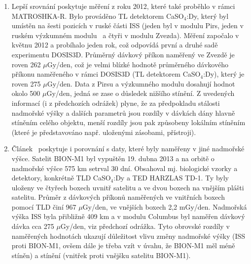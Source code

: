 \begin{enumerate}
není \cite{passDetectors}. (Poznámka: lze srovnat obr. \ref{fig:dosis_passDetectors_LETspektrum} s obr. \ref{fig:stineni} -- rozdíl ve spektrech je způsoben tím, že první obr. představuje diferenciální spektrum, zatímco druhý zobrazuje integrální spektrum.) 
\begin{figure}[h]
  \centering
  \texttt{[image: dosis\_LETspektrum\_passDetectors.jpg]}
  \caption{$\LET$ spektra z dat naměřených v modulu Pirs (Piers-1) a v modulu Zvezda (SM) v příslušných SPD.~\cite{passDetectors}}
  \label{fig:dosis_passDetectors_LETspektrum}
\end{figure}
\item Lepší srovnání poskytuje měření z roku 2012, které také proběhlo v rámci MATROSHKA-R. Bylo prováděno TL detektorem CaSO$_4$:Dy, který byl umístěn na šesti pozicích v ruské části ISS (jeden byl v modulu Pirs, jeden v ruském výzkumném modulu~\cite{researchModule} a čtyři v modulu Zvezda). Měření započalo v květnu 2012 a probíhalo jeden rok, což odpovídá první a druhé sadě experimentu DOSIS3D. Průměrný dávkový příkon naměřený ve Zvezdě je roven 262 $\mu$Gy/den, což je velmi blízké hodnotě průměrného dávkového příkonu naměřeného v rámci DOSIS3D (TL detektorem CaSO$_4$:Dy), který je roven 275 $\mu$Gy/den. Data z Pirsu a výzkumného modulu dosahují hodnot okolo 500 $\mu$Gy/den, jedná se zase o důsledek nižšího stínění. Z uvedených informací (i z předchozích odrážek) plyne, že za předpokladu
  stálosti nadmořské výšky a dalších parametrů jsou rozdíly v dávkách dány hlavně stíněním celého objektu, menší rozdíly jsou pak způsobeny lokálním stíněním (které je představováno např. uloženými zásobami, přístroji).~\cite{ambrozova_dvaExperimenty}
  \item Článek~\cite{ambrozova_dvaExperimenty} poskytuje i porovnání s daty, které byly naměřeny v jiné nadmořské výšce. Satelit BION-M1 byl vypuštěn 19. dubna 2013 a na orbitě o nadmořské výšce 575 km setrval 30 dní. Obsahoval mj. biologické vzorky a detektory, konkrétně TLD CaSO$_4$:Dy a TED HARZLAS TD-1. Ty byly uloženy ve čtyřech boxech uvnitř satelitu a ve dvou boxech na vnějším plášti satelitu. Průměr z dávkových příkonů naměřených ve vnitřních boxech pomocí TLD činí 967 $\mu$Gy/den, ve vnějších boxech 2,2 mGy/den. Nadmořská výška ISS byla přibližně 409 km a v modulu Columbus byl naměřen dávkový dávka cca 275 $\mu$Gy/den, viz předchozí odrážka. Tyto obrovské rozdíly v naměřených hodnotách ukazují důležitost vlivu změny nadmořské výšky (ISS proti BION-M1, ovšem dále je třeba vzít v úvahu, že BION-M1 měl méně
	stíněn) a stínění (vnitřek proti vnějšku satelitu BION-M1).

\end{enumerate}
